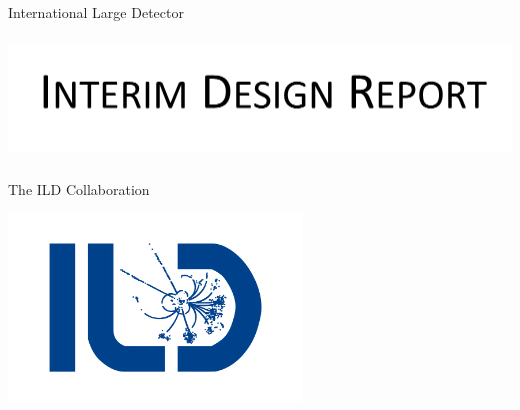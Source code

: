 %
%
\begin{titlepage}
\begin{center}
~
 ~\vskip 0.5cm

    {\huge  International} 
    {\huge  Large} 
    {\huge  Detector}
\vskip 3cm


\noindent\makebox[\linewidth]{\rule{\textwidth}{0.4pt}}
\begin{center}
\includegraphics[height=3.3cm]{Title.png}
\end{center}


\noindent\makebox[\linewidth]{\rule{\textwidth}{0.4pt}}
\vskip 1.2cm




    

{\Large The ILD Collaboration}



\vskip 3cm
\end{center}
\begin{center}
\includegraphics[height=5cm]{ildlogo_Zh-mumuh_sharper_blueonwhite.png}
\end{center}

  \vfill\ 
    
    \centering{\large \today}
\end{titlepage}

